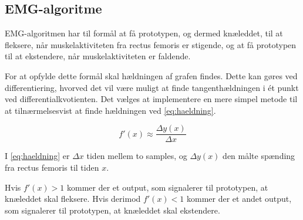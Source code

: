 \subsection{EMG-algoritme}
EMG-algoritmen har til formål at få prototypen, og dermed knæleddet, til at fleksere, når muskelaktiviteten fra rectus femoris er stigende, og at få prototypen til at ekstendere, når muskelaktiviteten er faldende. 

For at opfylde dette formål skal hældningen af grafen findes. Dette kan gøres ved differentiering, hvorved det vil være muligt at finde tangenthældningen i ét punkt ved differentialkvotienten. Det vælges at implementere en mere simpel metode til at tilnærmelsesvist at finde hældningen ved \autoref{eq:haeldning}.

\begin{equation}
f'(x)\approx\dfrac{\Delta y(x)}{\Delta x}
\label{eq:haeldning}
\end{equation}

\noindent
I \autoref{eq:haeldning} er $\Delta x$ tiden mellem to samples, og $\Delta y(x)$ den målte spænding fra rectus femoris til tiden $x$. 

Hvis $f'(x)>1$ kommer der et output, som signalerer til prototypen, at knæleddet skal fleksere. Hvis derimod $f'(x)<1$ kommer der et andet output, som signalerer til prototypen, at knæleddet skal ekstendere.